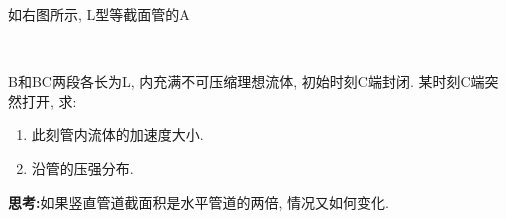 \begin{problem}[问题4.3]如右图所示, L型等截面管的A
\vspace{-2em}

\begin{multicols}{2}
~

B和BC两段各长为L, 内充满不可压缩理想流体,
初始时刻C端封闭. 某时刻C端突然打开, 求:
\begin{enumerate}
\item 此刻管内流体的加速度大小.
\item 沿管的压强分布.
\end{enumerate}
\textbf{思考:}如果竖直管道截面积是水平管道的两倍, 情况又如何变化.
\begin{center}

\end{center}
\end{multicols}
\end{problem}

